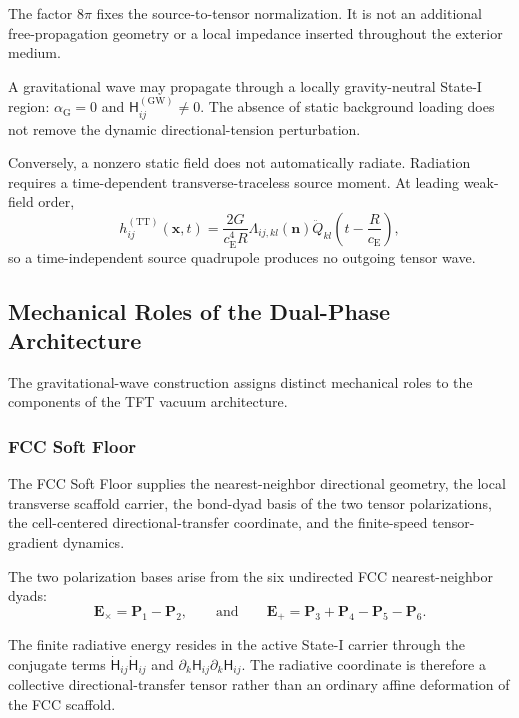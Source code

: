 The factor $8\pi$ fixes the source-to-tensor normalization. It is not an additional free-propagation geometry or a local impedance inserted throughout the exterior medium.

A gravitational wave may propagate through a locally gravity-neutral State-I region: $\alpha_{\mathrm{G}} = 0$ and $\mathsf{H}_{ij}^{(\mathrm{GW})} \neq 0$. The absence of static background loading does not remove the dynamic directional-tension perturbation.

Conversely, a nonzero static field does not automatically radiate. Radiation requires a time-dependent transverse-traceless source moment. At leading weak-field order,
\begin{equation}
    h_{ij}^{(\mathrm{TT})} (\mathbf{x},t) = \frac{ 2G }{ c_{\mathrm{E}}^{4}R } \Lambda_{ij,kl}(\mathbf{n}) \ddot{Q}_{kl} \left( t-\frac{R}{c_{\mathrm{E}}} \right),
    \label{eq:n12_quadrupole_strain}
\end{equation}
so a time-independent source quadrupole produces no outgoing tensor wave.

\subsection{Mechanical Roles of the Dual-Phase Architecture}
\label{subsec:n12_dual_phase_roles}

The gravitational-wave construction assigns distinct mechanical roles to the components of the TFT vacuum architecture.

\subsubsection{FCC Soft Floor}

The FCC Soft Floor supplies the nearest-neighbor directional geometry, the local transverse scaffold carrier, the bond-dyad basis of the two tensor polarizations, the cell-centered directional-transfer coordinate, and the finite-speed tensor-gradient dynamics.

The two polarization bases arise from the six undirected FCC nearest-neighbor dyads:
\begin{equation}
    \mathbf{E}_{\times} = \mathbf{P}_{1} - \mathbf{P}_{2}, \qquad \text{and} \qquad \mathbf{E}_{+} = \mathbf{P}_{3} + \mathbf{P}_{4} - \mathbf{P}_{5} - \mathbf{P}_{6}.
\end{equation}

The finite radiative energy resides in the active State-I carrier through the conjugate terms $\dot{\mathsf{H}}_{ij} \dot{\mathsf{H}}_{ij}$ and $\partial_{k}\mathsf{H}_{ij} \partial_{k}\mathsf{H}_{ij}$. The radiative coordinate is therefore a collective directional-transfer tensor rather than an ordinary affine deformation of the FCC scaffold.

